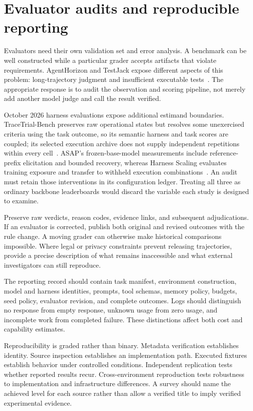 \section{Evaluator audits and reproducible reporting}\label{sec:C26:audit}
Evaluators need their own validation set and error analysis. A benchmark can be well constructed while a particular grader accepts artifacts that violate requirements. AgentHorizon and TestJack expose different aspects of this problem: long-trajectory judgment and insufficient executable tests~\cite{corpus261011050,yao2026testjack}. The appropriate response is to audit the observation and scoring pipeline, not merely add another model judge and call the result verified.

October 2026 harness evaluations expose additional estimand boundaries. TraceTrial-Bench preserves raw operational states but resolves some unexercised criteria using the task outcome, so its semantic harness and task scores are coupled; its selected execution archive does not supply independent repetitions within every cell~\cite{ch01_tracetrial2026}. ASAP's frozen-base-model measurements include reference-prefix elicitation and bounded recovery, whereas Harness Scaling evaluates training exposure and transfer to withheld execution combinations~\cite{ch01_asap2026,ch01_harnessscaling2026}. An audit must retain those interventions in its configuration ledger. Treating all three as ordinary backbone leaderboards would discard the variable each study is designed to examine.

Preserve raw verdicts, reason codes, evidence links, and subsequent adjudications. If an evaluator is corrected, publish both original and revised outcomes with the rule change. A moving grader can otherwise make historical comparisons impossible. Where legal or privacy constraints prevent releasing trajectories, provide a precise description of what remains inaccessible and what external investigators can still reproduce.

The reporting record should contain task manifest, environment construction, model and harness identities, prompts, tool schemas, memory policy, budgets, seed policy, evaluator revision, and complete outcomes. Logs should distinguish no response from empty response, unknown usage from zero usage, and incomplete work from completed failure. These distinctions affect both cost and capability estimates.

Reproducibility is graded rather than binary. Metadata verification establishes identity. Source inspection establishes an implementation path. Executed fixtures establish behavior under controlled conditions. Independent replication tests whether reported results recur. Cross-environment reproduction tests robustness to implementation and infrastructure differences. A survey should name the achieved level for each source rather than allow a verified title to imply verified experimental evidence.

